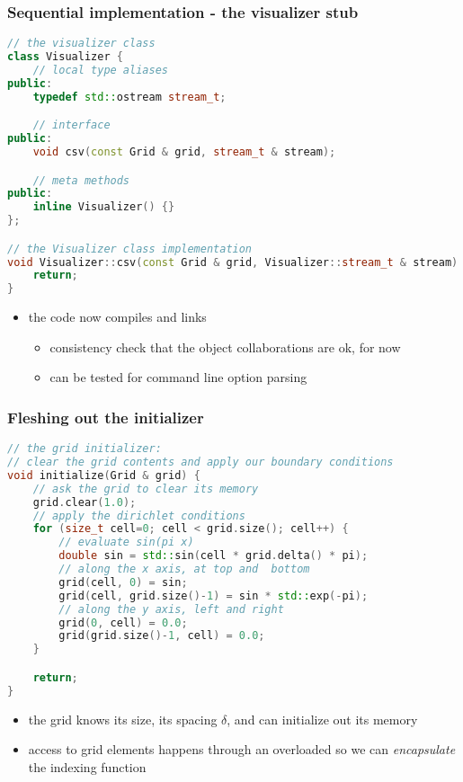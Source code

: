 \begin{frame}[fragile]
%
  \frametitle{Sequential implementation - the visualizer stub}
%
  \begin{lstlisting}[language=c++,name=seq:frame, firstnumber=97]
// the visualizer class
class Visualizer {
    // local type aliases
public:
    typedef std::ostream stream_t;

    // interface
public:
    void csv(const Grid & grid, stream_t & stream);

    // meta methods
public:
    inline Visualizer() {}
};

// the Visualizer class implementation
void Visualizer::csv(const Grid & grid, Visualizer::stream_t & stream) {
    return;
}
  \end{lstlisting}
%

\begin{itemize}
\item the code now compiles and links
  \begin{itemize}
  \item consistency check that the object collaborations are ok, for now
  \item can be tested for command line option parsing
  \end{itemize}
\end{itemize}
% 
\end{frame}

\begin{frame}[fragile]
%
  \frametitle{Fleshing out the initializer}
%
  \begin{lstlisting}[language=c++,name=seq:initializer]
// the grid initializer:
// clear the grid contents and apply our boundary conditions 
void initialize(Grid & grid) {
    // ask the grid to clear its memory
    grid.clear(1.0);
    // apply the dirichlet conditions
    for (size_t cell=0; cell < grid.size(); cell++) {
        // evaluate sin(pi x)
        double sin = std::sin(cell * grid.delta() * pi);
        // along the x axis, at top and  bottom
        grid(cell, 0) = sin;
        grid(cell, grid.size()-1) = sin * std::exp(-pi);
        // along the y axis, left and right
        grid(0, cell) = 0.0;
        grid(grid.size()-1, cell) = 0.0;
    }

    return;
}
  \end{lstlisting}
%
  \begin{itemize}
  \item the grid knows its size, its spacing $\delta$, and can initialize out its  memory
  \item access to grid elements happens through an overloaded  so we can
    {\em encapsulate} the indexing function
  \end{itemize}
%
\end{frame}

